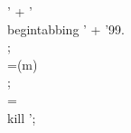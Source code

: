 \documentclass[11pt]{amsart} \n' +
\begin{document}
 \n' +
  '\\begin{tabbing} \n' +
  '99.\\;\\=(m)\\;\\=\\kill \n';
\end{document}
